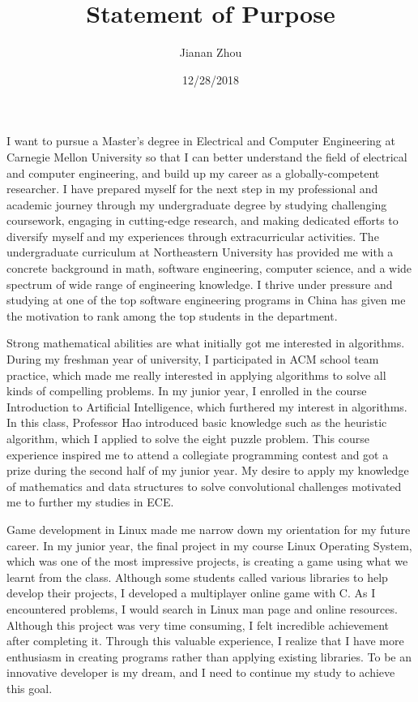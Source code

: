 \documentclass[16pt，letterpaper]{ctexart}
\title{Statement of Purpose}
\author{Jianan Zhou}
\date{12/28/2018}
\begin{document}
  \maketitle%
  \thispagestyle{empty}
  \vspace{12pt}

I want to pursue a Master’s degree in Electrical and Computer Engineering at Carnegie Mellon University so that I can better understand the field of electrical and computer engineering, and build up my career as a globally-competent researcher. I have prepared myself for the next step in my professional and academic journey through my undergraduate degree by studying challenging coursework, engaging in cutting-edge research, and making dedicated efforts to diversify myself and my experiences through extracurricular activities. The undergraduate curriculum at Northeastern University has provided me with a concrete background in math, software engineering, computer science, and a wide spectrum of wide range of engineering knowledge. I thrive under pressure and studying at one of the top software engineering programs in China has given me the motivation to rank among the top students in the department.

Strong mathematical abilities are what initially got me interested in algorithms. During my freshman year of university, I participated in ACM school team practice, which made me really interested in applying algorithms to solve all kinds of compelling problems. In my junior year, I enrolled in the course Introduction to Artificial Intelligence, which furthered my interest in algorithms. In this class, Professor Hao introduced basic knowledge such as the heuristic algorithm, which I applied to solve the eight puzzle problem. This course experience inspired me to attend a collegiate programming contest and got a prize during the second half of my junior year. My desire to apply my knowledge of mathematics and data structures to solve convolutional challenges motivated me to further my studies in ECE.

Game development in Linux made me narrow down my orientation for my future career. In my junior year, the final project in my course Linux Operating System, which was one of the most impressive projects, is creating a game using what we learnt from the class. Although some students called various libraries to help develop their projects, I developed a multiplayer online game with C. As I encountered problems, I would search in Linux man page and online resources. Although this project was very time consuming, I felt incredible achievement after completing it. Through this valuable experience, I realize that I have more enthusiasm in creating programs rather than applying existing libraries. To be an innovative developer is my dream, and I need to continue my study to achieve this goal.
\end{document}
